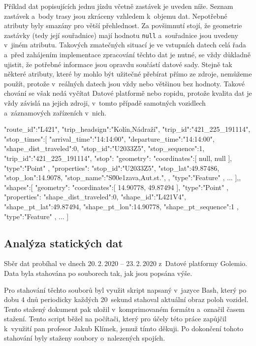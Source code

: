 \bigbreak

Příklad dat popisujících jednu jízdu včetně zastávek je uveden níže. Seznam zastávek a~body trasy jsou zkráceny vzhledem k~objemu dat. Nepotřebné atributy byly smazány pro větší přehlednost. Za povšimnutí stojí, že geometrie zastávky (tedy její souřadnice) mají hodnotu \verb-null- a~souřadnice jsou uvedeny v~jiném atributu. Takových zmatečných situací je ve vstupních datech celá řada a~před zahájením implementace zpracování těchto dat je nutné, se vždy důkladně ujistit, že potřebné informace jsou opravdu součástí datové sady. Stejně tak některé atributy, které by mohlo být užitečné přebírat přímo ze zdroje, nemůžeme použít, protože v~reálných datech jsou vždy nebo většinou bez hodnoty. Takové chování se však nedá vyčítat Datové platformě nebo \gls{ropid}u, protože kvalita dat je vždy závislá na jejich zdroji, v~tomto případě samotných vozidlech a~záznamových zařízeních v~nich.

\begin{code}[frame=none]
"route_id":"L421",
"trip_headsign":"Kolín,Nádraží",
"trip_id":"421_225_191114",
"stop_times":[{
  "arrival_time":"14:14:00",
  "departure_time":"14:14:00",
  "shape_dist_traveled":0,
  "stop_id":"U2033Z5",
  "stop_sequence":1,
  "trip_id":"421_225_191114",
  "stop":{
    "geometry":{
      "coordinates":[
        null,
        null
      ],
      "type":"Point"
    },
    "properties":{
      "stop_id":"U2033Z5",
      "stop_lat":49.87486,
      "stop_lon":14.9078,
      "stop_name":"S\u00e1zava,Aut.st.",
    },
    "type":"Feature"
  },
  ...
],},
"shapes":[{
  "geometry":{
    "coordinates":[
      14.90778,
      49.87494
    ],
    "type":"Point"
  },
  "properties":{
    "shape_dist_traveled":0,
    "shape_id":"L421V4",
    "shape_pt_lat":49.87494,
    "shape_pt_lon":14.90778,
    "shape_pt_sequence":1
  },
  "type":"Feature"
},
...
]

\end{code}

\subsection{Analýza statických dat}

Sběr dat probíhal ve dnech 20.\,2.\,2020 -- 23.\,2.\,2020 z~Datové platformy Golemio. Data byla stahována po souborech tak, jak jsou popsána výše.

\bigbreak

Pro stahování těchto souborů byl využit skript napsaný v~jazyce Bash, který po dobu 4 dnů periodicky každých 20~sekund stahoval aktuální obraz poloh vozidel. Tento stažený dokument pak uložil v~komprimovaném formátu a~označil časem stažení. Tento script běžel na počítači, který pro účely této práce zapůjčil k~využití pan profesor Jakub Klímek, jemuž tímto děkuji. Po dokončení tohoto stahování byly staženy soubory o~nalezených spojích.

